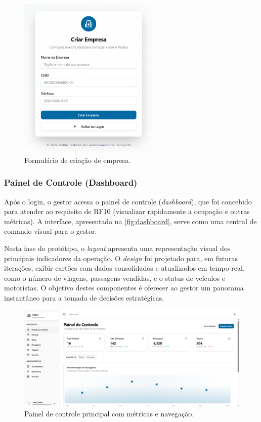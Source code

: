 \begin{figure}[H]
  \centering
  \includegraphics[width=0.6\textwidth]{imagens/criacao-empresa.png}
  \caption{Formulário de criação de empresa.}
  \label{fig:criacao-empresa}
\end{figure}

\subsubsection{Painel de Controle (Dashboard)}
Após o login, o gestor acessa o painel de controle (\textit{dashboard}), que foi concebido para atender ao requisito de RF10 (visualizar rapidamente a ocupação e outras métricas). A interface, apresentada na \autoref{fig:dashboard}, serve como uma central de comando visual para o gestor.

Nesta fase do protótipo, o \textit{layout} apresenta uma representação visual dos principais indicadores da operação. O \textit{design} foi projetado para, em futuras iterações, exibir cartões com dados consolidados e atualizados em tempo real, como o número de viagens, passagens vendidas, e o status de veículos e motoristas. O objetivo destes componentes é oferecer ao gestor um panorama instantâneo para a tomada de decisões estratégicas.

\begin{figure}[H]
  \centering
  \includegraphics[width=1\textwidth]{imagens/dashboard.png}
  \caption{Painel de controle principal com métricas e navegação.}
  \label{fig:dashboard}
\end{figure}

